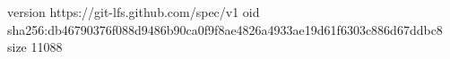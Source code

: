 version https://git-lfs.github.com/spec/v1
oid sha256:db46790376f088d9486b90ca0f9f8ae4826a4933ae19d61f6303c886d67ddbc8
size 11088

